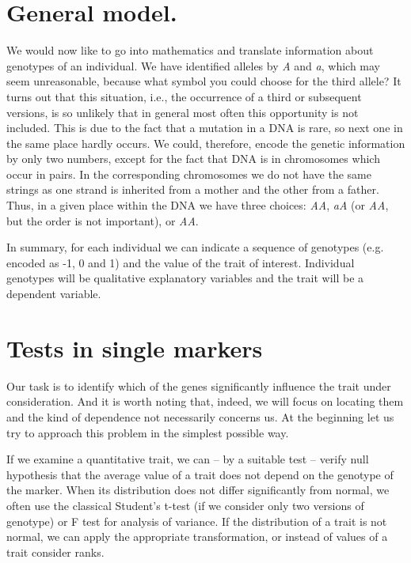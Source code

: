 \documentclass[]{MathAppl18}
\begin{document}
\section{General model.} We would now like to go into mathematics and translate information about genotypes of an individual. We have identified alleles by {\it A} and {\it a}, which may seem unreasonable, because what symbol you could choose for the third allele? It turns out that this situation, i.e., the occurrence of a third or subsequent versions, is so unlikely that in general most often this opportunity is not included. This is due to the fact that a mutation in a DNA is rare, so next one in the same place hardly occurs. We could, therefore, encode the genetic information by only two numbers, except for the fact that DNA is in chromosomes which occur in pairs. In the corresponding chromosomes we do not have the same strings as one strand is inherited from a mother and the other from a father. Thus, in a given place within the DNA we have three choices: \textit{AA}, \textit{aA} (or \textit{AA}, but the order is not important), or \textit{AA}.

In summary, for each individual we can indicate a sequence of genotypes (e.g. encoded as -1, 0 and 1) and the value of the trait of interest. Individual genotypes will be qualitative explanatory variables and the trait will be a dependent variable.


\section{Tests in single markers}
Our task is to identify which of the genes significantly influence the trait under consideration. And it is worth noting that, indeed, we will focus on locating them and the kind of dependence not necessarily concerns us. At the beginning let us try to approach this problem in the simplest possible way.

If we examine a quantitative trait, we can -- by a suitable test -- verify null hypothesis that the average value of a trait does not depend on the genotype of the marker. When its distribution does not differ significantly from normal, we often use the classical Student's t-test (if we consider only two versions of genotype) or F test for analysis of variance. If the distribution of a trait is not normal, we can apply the appropriate transformation, or instead of values of a trait consider ranks.
\end{document}
